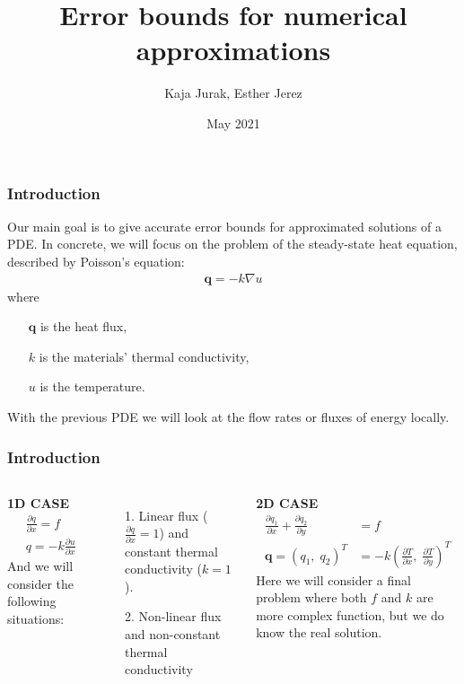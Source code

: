\documentclass[t]{beamer}
\title{Error bounds for numerical approximations}
\author[MAT264] 
{Kaja Jurak, Esther Jerez}
\institute[UIB]
{
	Faculty of Mathematics\\
	University of Bergen
	
}
\date[2021]
{May 2021}
\begin{document}
	\frame{\titlepage}
	\begin{frame}
	\frametitle{Introduction}
	Our main goal is to give accurate error bounds for approximated solutions of a PDE. In concrete, we will focus on the problem of the steady-state heat equation, described by  \alert{Poisson's equation}:
	\begin{align*}
	\bm{q} = -k \nabla  u
	\end{align*}
	where 
	\begin{enumerate}
		\item[] $\bm{q}$ is the heat flux,
		\item[] $k$ is the materials' thermal conductivity,
		\item[] $u$ is the temperature.
	\end{enumerate}
	With the previous PDE we will look at the flow rates or fluxes of energy locally. \\
	
	
\end{frame}

\begin{frame}
\frametitle{Introduction}
\begin{columns}[t]
	\textbf{1D CASE}
	\begin{align*}
	&\frac{\partial q}{\partial x} = f \\
	&q = -k \frac{\partial u}{\partial x} 
	\end{align*}
	And we will consider the following situations:
	\begin{itemize}
		\item[1.] Linear flux ($\frac{\partial q}{\partial x} = 1$) and constant thermal conductivity ($k=1$).
		\item[2.] Non-linear flux and non-constant thermal conductivity
	\end{itemize}
	
	\textbf{2D CASE} \\
	\begin{align*}
	\frac{\partial q_1}{\partial x} + \frac{\partial q_2}{\partial y}  &= f \\
	\bm{q} = (q_1,\; q_2)^T  &= -k \left( \frac{\partial T}{\partial x} ,\; \frac{\partial T}{\partial y}\right)^T
	\end{align*}
	Here we will consider a final problem where both $f$ and $k$ are more complex function, but we do know the real solution.
\end{columns}        
\end{frame}
\end{document}
